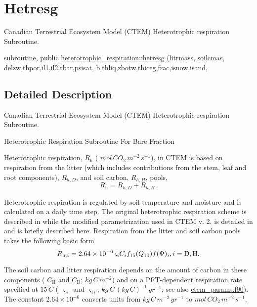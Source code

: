 \hypertarget{group__hetresg}{}\section{Hetresg}
\label{group__hetresg}


Canadian Terrestrial Ecosystem Model (C\+T\+E\+M) Heterotrophic respiration Subroutine.  


\begin{DoxyCompactItemize}
\item 
subroutine, public \hyperlink{group__hetresg_gaf35383e36392dff7ca33ff9022cb70c0}{heterotrophic\+\_\+respiration\+::hetresg} (litrmass, soilcmas, delzw,thpor,il1,il2,tbar,psisat, b,thliq,zbotw,thiceg,frac,isnow,isand,
\end{DoxyCompactItemize}


\subsection{Detailed Description}
Canadian Terrestrial Ecosystem Model (C\+T\+E\+M) Heterotrophic respiration Subroutine. 

Heterotrophic Respiration Subroutine For Bare Fraction

Heterotrophic respiration, $R_\mathrm{h}$ ( $mol\,CO_2\,m^{-2}\,s^{-1}$), in C\+T\+E\+M is based on respiration from the litter (which includes contributions from the stem, leaf and root components), $R_{h,D}$, and soil carbon, $R_{h,H}$, pools, \[ \label{hetres_all} R_\mathrm{h}=R_{h,D}+R_{h,H}. \]

Heterotrophic respiration is regulated by soil temperature and moisture and is calculated on a daily time step. The original heterotrophic respiration scheme is described in \cite{Arora2003-3b7} while the modified parametrization used in C\+T\+E\+M v. 2. is detailed in \cite{Melton2014-xy} and is briefly described here. Respiration from the litter and soil carbon pools takes the following basic form \[ R_{\mathrm{h},i} = 2.64 \times 10^{-6}\,\varsigma_i C_i f_{15}(Q_{10}) f(\Psi)_i, \nonumber \\ i = \mathrm{D}, \mathrm{H}.\label{lithet} \]

The soil carbon and litter respiration depends on the amount of carbon in these components ( $C_\mathrm{H}$ and $C_\mathrm{D}$; $kg\,C\,m^{-2}$) and on a P\+F\+T-\/dependent respiration rate specified at $15\,{C}$ ( $\varsigma_\mathrm{H}$ and $\varsigma_\mathrm{D}$; $kg\,C\,(kg\,C)^{-1}\,yr^{-1}$; see also \hyperlink{ctem__params_8f90}{ctem\+\_\+params.\+f90}). The constant $2.64 \times 10^{-6}$ converts units from $kg\,C\,m^{-2}\,yr^{-1}$ to $mol\,CO_2\,m^{-2}\,s^{-1}$.

